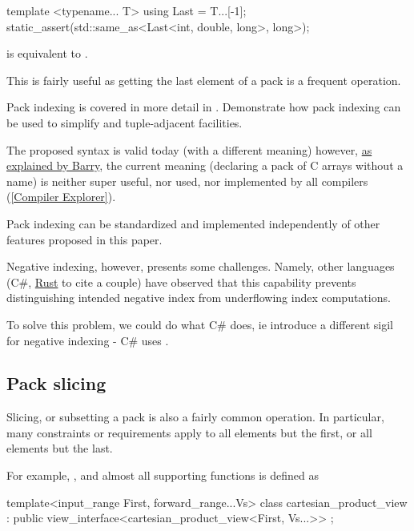 \documentclass{wg21}
\begin{document}
\begin{colorblock}
template <typename... T>
using Last = T...[-1];
static_assert(std::same_as<Last<int, double, long>, long>);
\end{colorblock}

 is equivalent to .


This is fairly useful as getting the last element of a pack is a frequent operation.


Pack indexing is covered in more detail in .  Demonstrate how pack indexing can be used to simplify
 and tuple-adjacent facilities.

The proposed syntax is valid today (with a different meaning) however, \href{https://www.open-std.org/jtc1/sc22/wg21/docs/papers/2020/p1858r2.html#pack-indexing-ambiguity}{as explained by Barry},
the current meaning (declaring a pack of C arrays without a name) is neither super useful, nor used, nor implemented by all compilers (\href{https://godbolt.org/z/6obhffPTP}{[Compiler Explorer]}).

Pack indexing can be standardized and implemented independently of other features proposed in this paper.

Negative indexing, however, presents some challenges.
Namely, other languages (C\#, \href{https://github.com/rust-lang/rfcs/issues/2249#issuecomment-352128826}{Rust} to cite a couple) have observed that this capability prevents distinguishing intended negative index from underflowing index computations.

To solve this problem, we could do what C\# does, ie introduce a different sigil for negative indexing - C\# uses \tcode{\caret}.

\subsection{Pack slicing}

Slicing, or subsetting a pack is also a fairly common operation.
In particular, many constraints or requirements apply to all elements but the first, or all elements but the last.

For example, , and almost all supporting functions is defined as

\begin{colorblock}
template<input_range First, forward_range...Vs>
class cartesian_product_view : public view_interface<cartesian_product_view<First, Vs...>> {};
\end{colorblock}
\end{document}
